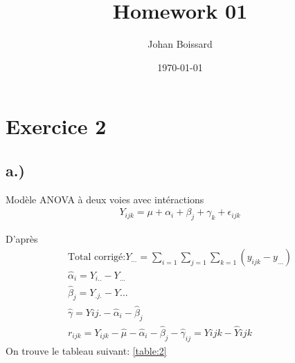 \documentclass[a4paper]{article}
\title{Homework 01}
\author{Johan Boissard}
\date\today
\begin{document}
\section*{Exercice 2}
\subsection*{a.)}

Modèle ANOVA à deux voies avec intéractions
\begin{eqnarray*}
	Y_{ijk}=\mu+\alpha_i+\beta_j+\gamma_{k}+\epsilon_{ijk}
\end{eqnarray*}

D'après
\begin{eqnarray*}
	\text{Total corrigé:} Y_{\dots}=\sum_{i=1}\sum_{j=1}\sum_{k=1}(y_{ijk}-y_{...})
	\\
	\hat{\alpha}_i=Y_{i..}-Y_{...}
	\\
	\hat{\beta}_j=Y_{.j.}-Y{...}
	\\
	\hat\gamma=Y{ij.}-\hat\alpha_i-\hat\beta_j
	\\
	r_{ijk}=Y_{ijk}-\hat\mu-\hat\alpha_i-\hat\beta_j-\hat\gamma_{ij}=Y{ijk}-\hat Y{ijk}
\end{eqnarray*}
On trouve le tableau suivant: \ref{table:2}

	
\end{document}
